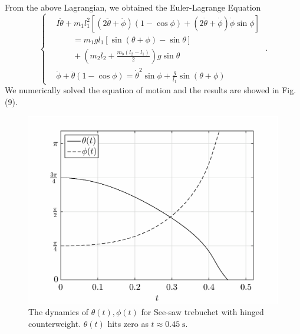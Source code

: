 \documentclass[%
reprint,
amsmath,amssymb,
aps,
]{revtex4-1}
\begin{document}
	From the above Lagrangian, we obtained the Euler-Lagrange Equation
	\begin{equation}
	\left\{
	\begin{aligned}
	&I\ddot{\theta} + m_1l_1^2\left[
	(2\ddot{\theta}+\ddot{\phi})(1-\cos\phi)
	+
	(2\dot{\theta}+\dot{\phi})\dot{\phi}\sin\phi
	\right]
	\\
	&\qquad=
	m_1 g l_1[\sin(\theta+\phi)-\sin\theta]
	\\ &\qquad
	+
	\left(m_2l_2+\frac{m_b(l_2-l_1)}{2}\right)g\sin\theta
	\\
	&\ddot{\phi} + \ddot{\theta}(1-\cos\phi)  
	=\dot{\theta}^2\sin\phi
	+\frac{g}{l_1}\sin(\theta+\phi)
	\end{aligned}\right.\;.
	\end{equation}
	We numerically solved the equation of motion and the results are showed in Fig.(9).
	\begin{figure}[h]
		\centering
		\includegraphics[scale=0.34
		]{hingedlbk1.eps}
		\caption{The dynamics of $\theta(t),\phi(t)$ for See-saw trebuchet with hinged counterweight. $\theta(t)$ hits zero as $t\approx 0.45\;\mathrm{s}$.}
		\label{range1}
	\end{figure}
\end{document}
